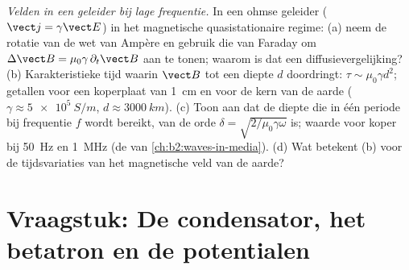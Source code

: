 \begin{exercise}[$\star\star\star$]\label{exo:b2:maxwell-equations:12}
\emph{Velden in een geleider bij lage frequentie.} In een ohmse geleider
($\vect j = \gamma\vect E$) in het magnetische quasistationaire regime: (a)
neem de rotatie van de wet van Ampère en gebruik die van Faraday om
$\Delta\vect B = \mu_0\gamma\,
\partial_t\vect B$ aan te tonen; waarom is
dat een diffusievergelijking? (b) Karakteristieke tijd waarin $\vect B$ tot
een diepte $d$ doordringt: $\tau \sim \mu_0\gamma d^2$; getallen voor een
koperplaat van \qty{1}{cm} en voor de kern van de aarde
($\gamma \approx \qty{5e5}{S/m}$, $d \approx \qty{3000}{km}$). (c) Toon aan
dat de diepte die in één periode bij frequentie $f$ wordt bereikt, van de
orde $\delta = \sqrt{2/\mu_0\gamma\omega}$ is; waarde voor koper bij
\qty{50}{Hz} en \qty{1}{MHz} (de  van
\cref{ch:b2:waves-in-media}). (d) Wat betekent (b) voor de tijdsvariaties
van het magnetische veld van de aarde?
\end{exercise}

\section{Vraagstuk: De condensator, het betatron en de potentialen}

